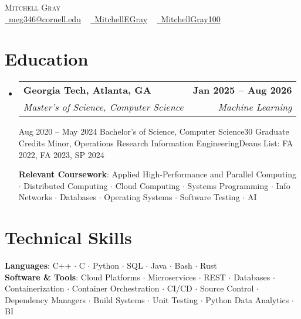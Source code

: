 \documentclass[letterpaper,11pt]{article}
\makeatletter
\newcommand{\resumeSpecialSubheadingCornell}[6]{
  \vspace{-2pt}\item
    \begin{tabular*}{1.0\textwidth}[t]{l@{\extracolsep{\fill}}r}
      \textbf{#1} & \textbf{\small #2} \\
      \textit{\small#3} & \textit{\small #4} \\
      \textit{\small#5} & \textit{\small #6} \\
    \end{tabular*}\vspace{-7pt}
}
\newcommand{\resumeSpecialSubheadingGT}[6]{
  \vspace{-2pt}\item
    \begin{tabular*}{1.0\textwidth}[t]{l@{\extracolsep{\fill}}r}
      \textbf{#1} & \textbf{\small #2} \\
      \textit{\small#3} & \textit{\small #4} \\
    \end{tabular*}\vspace{-7pt}
}
\newcommand{\resumeSubHeadingListStart}{\begin{itemize}[leftmargin=0.0in, label={}]}
\newcommand{\resumeSubHeadingListEnd}{\end{itemize}}
\makeatother
\begin{document}
\begin{center}
    {\Huge \scshape Mitchell Gray} \\ \vspace{1pt}
    \small
    \href{mailto:meg346@cornell.edu}{\faEnvelope\ meg346@cornell.edu} ~ 
    \href{https://www.linkedin.com/in/mitchellegray/}{\faLinkedin\ MitchellEGray}  ~
    \href{https://github.com/MitchellGray100}{\faGithub\ MitchellGray100}
    \vspace{-8pt}
\end{center}


\section{\textcolor{customred}{Education}}
  \resumeSubHeadingListStart
    \resumeSpecialSubheadingGT
      {Georgia Tech, Atlanta, GA}{Jan 2025 -- Aug 2026}
      {Master's of Science, Computer Science}{Machine Learning}%


    \resumeSpecialSubheadingCornell
      {Cornell University, Ithaca, NY}{Aug 2020 -- May 2024}
      {Bachelor's of Science, Computer Science}{30 Graduate Credits}%
      {Minor, Operations Research Information Engineering}{Deans List: FA 2022, FA 2023, SP 2024}

      \vspace{2pt}
      \textbf{Relevant Coursework}: Applied High-Performance and Parallel Computing $\cdot$ Distributed Computing $\cdot$ Cloud 
      Computing $\cdot$ Systems Programming $\cdot$ Info Networks $\cdot$ Databases 
      $\cdot$ Operating Systems $\cdot$ Software Testing $\cdot$ AI 
      
    \resumeSubHeadingListEnd
\vspace{-18pt}

\section{\textcolor{customred}{Technical Skills}}
 \begin{itemize}[leftmargin=0.1in, label={}]
    \small{\item{
     \textbf{Languages}{: C++ $\cdot$ C $\cdot$ Python $\cdot$ SQL $\cdot$ Java $\cdot$ Bash $\cdot$ Rust} \\
     \textbf{Software \& Tools}{: 
     Cloud Platforms $\cdot$ Microservices $\cdot$ REST $\cdot$ Databases $\cdot$ Containerization $\cdot$ Container Orchestration $\cdot$ CI/CD $\cdot$ 
     Source Control $\cdot$ Dependency Managers $\cdot$
     Build Systems $\cdot$ Unit Testing $\cdot$ 
     Python Data Analytics $\cdot$ BI}\\
    }}
 \end{itemize}
 \vspace{-20pt}
\end{document}
